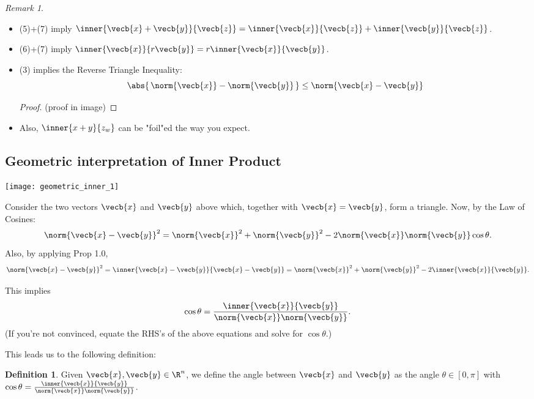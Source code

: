 \documentclass[a5paper]{article}
\theoremstyle{definition}%
\newtheorem*{definition*}{Definition}
\numberwithin{exercise}{section}
\theoremstyle{remark}%
\newtheorem*{remark*}{Remark}
\begin{document}
\begin{remark*}\mbox{}\\
\begin{itemize}
\item(5)+(7) imply $\inner{\vecb{x}+\vecb{y}}{\vecb{z}}=\inner{\vecb{x}}{\vecb{z}}+\inner{\vecb{y}}{\vecb{z}}$. \\
\item(6)+(7) imply $\inner{\vecb{x}}{r\vecb{y}}=r\inner{\vecb{x}}{\vecb{y}}$. \\
\item(3) implies the Reverse Triangle Inequality:
$$\abs{\,\norm{\vecb{x}}-\norm{\vecb{y}}\,}\leq\norm{\vecb{x}-\vecb{y}}$$
\begin{proof}
(proof in image)
\end{proof}

\item Also, $\inner{x+y}{z_w}$ can be "foil"ed the way you expect. 

\end{itemize}
\end{remark*}

\subsection{Geometric interpretation of Inner Product}

\begin{center}
\texttt{[image: geometric\_inner\_1]}
\end{center}

Consider the two vectors $\vecb{x}$ and $\vecb{y}$ above which, together with $\vecb{x}=\vecb{y}$, form a triangle. Now, by the Law of Cosines:
$$\norm{\vecb{x}-\vecb{y}}^2=\norm{\vecb{x}}^2+\norm{\vecb{y}}^2-2\norm{\vecb{x}}\norm{\vecb{y}}\cos\theta.$$
Also, by applying Prop 1.0, 
$$\norm{\vecb{x}-\vecb{y}}^2=\inner{\vecb{x}-\vecb{y}}{\vecb{x}-\vecb{y}}=\norm{\vecb{x}}^2+\norm{\vecb{y}}^2-2\inner{\vecb{x}}{\vecb{y}}.$$

This implies 
$$\cos\theta=\frac{\inner{\vecb{x}}{\vecb{y}}}{\norm{\vecb{x}}\norm{\vecb{y}}}.$$
(If you're not convinced, equate the RHS's of the above equations and solve for $\cos\theta$.)

This leads us to the following definition:

\begin{highlight}
\begin{definition*}
Given $\vecb{x}, \vecb{y}\in \R^n$, we define the angle between $\vecb{x}$ and $\vecb{y}$ as the angle $\theta\in[0,\pi]$ with $\cos\theta=\frac{\inner{\vecb{x}}{\vecb{y}}}{\norm{\vecb{x}}\norm{\vecb{y}}}$.
\end{definition*}
\end{highlight}
\end{document}
